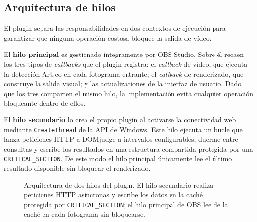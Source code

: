  
\subsection{Arquitectura de hilos}
\label{subsec:hilos}
 
El plugin separa las responsabilidades en dos contextos de ejecución para garantizar que ninguna
operación costosa bloquee la salida de vídeo.
 
El \textbf{hilo principal} es gestionado íntegramente por OBS Studio. Sobre él recaen los tres
tipos de \textit{callbacks} que el plugin registra: el \textit{callback} de vídeo, que ejecuta la
detección ArUco en cada fotograma entrante; el \textit{callback} de renderizado, que construye la salida
visual; y las actualizaciones de la interfaz de usuario. Dado que los tres comparten el mismo
hilo, la implementación evita cualquier operación bloqueante dentro de ellos.
 
El \textbf{hilo secundario} lo crea el propio plugin al activarse la conectividad web mediante
\texttt{CreateThread} de la API de Windows. Este hilo ejecuta un bucle que lanza peticiones HTTP
a DOMjudge a intervalos configurables, duerme entre consultas y escribe los resultados en una
estructura compartida protegida por una \texttt{CRITICAL\_SECTION}. De este modo el hilo
principal únicamente lee el último resultado disponible sin bloquear el renderizado.
 
\begin{figure}[H]
\centering
{}
\caption{Arquitectura de dos hilos del plugin. El hilo secundario realiza peticiones HTTP
asíncronas y escribe los datos en la caché protegida por \texttt{CRITICAL\_SECTION}; el
hilo principal de OBS lee de la caché en cada fotograma sin bloquearse.}
\label{fig:hilos}
\end{figure}
 
